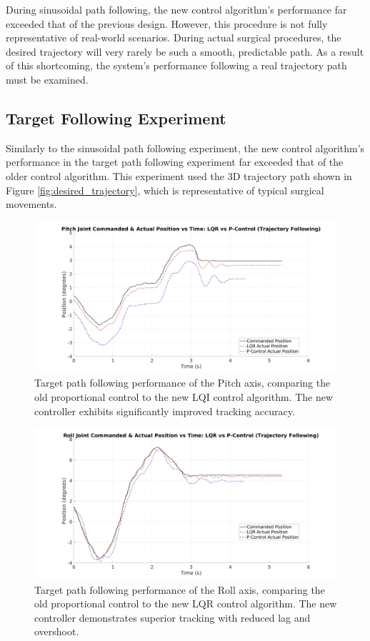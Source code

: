 During sinusoidal path following, the new control algorithm's performance far exceeded that of the previous design. However, this procedure is not fully representative of real-world scenarios. During actual surgical procedures, the desired trajectory will very rarely be such a smooth, predictable path. As a result of this shortcoming, the system's performance following a real trajectory path must be examined.

\subsection{Target Following Experiment}

Similarly to the sinusoidal path following experiment, the new control algorithm's performance in the target path following experiment far exceeded that of the older control algorithm. This experiment used the 3D trajectory path shown in Figure \ref{fig:desired_trajectory}, which is representative of typical surgical movements.

\begin{figure}[H]
    \centering
    \includegraphics[width=1.00\linewidth]{figures/pitch_traj_combined.jpg}
    \caption{Target path following performance of the Pitch axis, comparing the old proportional control to the new LQI control algorithm. The new controller exhibits significantly improved tracking accuracy.}
    \label{fig:pitch_traj_combined}
\end{figure}

\begin{figure}[h!]
    \centering
    \includegraphics[width=1.00\linewidth]{figures/roll_traj_combined.jpg}
    \caption{Target path following performance of the Roll axis, comparing the old proportional control to the new LQR control algorithm. The new controller demonstrates superior tracking with reduced lag and overshoot.}
    \label{fig:roll_traj_combined}
\end{figure}

